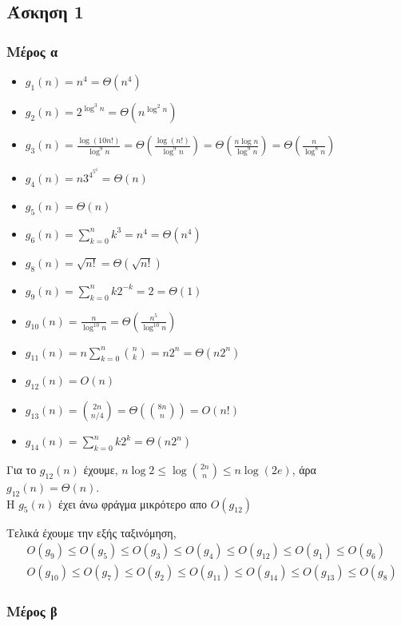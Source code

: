 \newpage
\subsection*{Άσκηση 1}

\subsubsection*{Μέρος α}

\begin{itemize}
    \item $g_1(n) = n^4 = \Theta(n^4)$
    \item $g_2(n) = 2^{\log^{3}n} = \Theta(n^{\log^{2}n})$
    \item $g_3(n) = \frac{\log(10n!)}{\log^9n} = \Theta(\frac{\log(n!)}{\log^9n}) = \Theta(\frac{n\log n}{\log^9n}) =  \Theta(\frac{n}{\log^8n})$
    \item $g_4(n) = n3^{4^{5^6}} = \Theta(n)$
    \item $g_5(n) = \Theta(n)$
    \item $g_6(n) = \sum_{k=0}^{n}k^3 = n^4 = \Theta(n^4)$
    \item $g_8(n) = \sqrt{n!} = \Theta(\sqrt{n!})$
    \item $g_9(n) = \sum_{k=0}^n k2^{-k} = 2 = \Theta(1)$
    \item $g_{10}(n) = \frac{n}{\log^{10}n} = \Theta(\frac{n^5}{\log^{10}n})$
    \item $g_{11}(n) = n \sum_{k=0}^{n} \binom{n}{k} = n 2^n = \Theta(n2^n)$
    \item $g_{12}(n) = O(n)$
    \item $g_{13}(n) = \binom{2n}{n/4} = \Theta(\binom{8n}{n}) = O(n!)$
    \item $g_{14}(n) = \sum_{k=0}^n k2^k = \Theta(n2^n)$
\end{itemize}


Για το $g_{12}(n)$ έχουμε, $n\log2 \le \log\binom{2n}{n} \le n\log(2e) $, άρα $g_{12}(n) = \Theta(n)$.\\
Η $g_5(n)$ έχει άνω φράγμα μικρότερο απο $O(g_{12})$

Τελικά έχουμε την εξής ταξινόμηση,
\begin{align*} & O(g_9) \le O(g_5) \le O(g_3) \le O(g_4) \le O(g_{12}) \le O(g_1) \le O(g_6) \\
               & O(g_{10}) \le O(g_7) \le O(g_2) \le O(g_{11}) \le O(g_{14}) \le O(g_{13}) \le O(g_8)
\end{align*}

\subsubsection*{Μέρος β}

